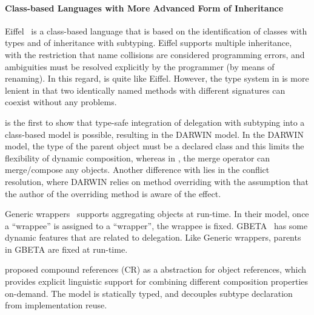 \paragraph{Class-based Languages with More Advanced Form of Inheritance}

Eiffel~\cite{meyer1987eiffel} is a class-based language that is based on the
identification of classes with types and of inheritance with subtyping. Eiffel
supports multiple inheritance, with the restriction that name collisions are
considered programming errors, and ambiguities must be resolved explicitly by
the programmer (by means of renaming). In this regard, \name is quite like
Eiffel. However, the type system in \name is more lenient in that two
identically named methods with different signatures can coexist without any
problems.

\citet{kniesel1999type} is the first to show that type-safe integration of
delegation with subtyping into a class-based model is possible, resulting in the
DARWIN model. In the DARWIN model, the type of the parent object must be a
declared class and this limits the flexibility of dynamic composition, whereas
in \name, the merge operator can merge/compose any objects. Another difference
with \name lies in the conflict resolution, where DARWIN relies on method
overriding with the assumption that the author of the overriding method is aware
of the effect.

Generic wrappers~\cite{buchi2000generic} supports aggregating objects at
run-time. In their model, once a ``wrappee'' is assigned to a ``wrapper'', the
wrappee is fixed. GBETA~\cite{ernst2000gbeta} has some dynamic features that are
related to delegation. Like Generic wrappers, parents in GBETA are fixed at
run-time.

\citet{ostermann2001object} proposed compound references (CR) as a abstraction
for object references, which provides explicit linguistic support for combining
different composition properties on-demand. The model is statically typed, and
decouples subtype declaration from implementation reuse.

